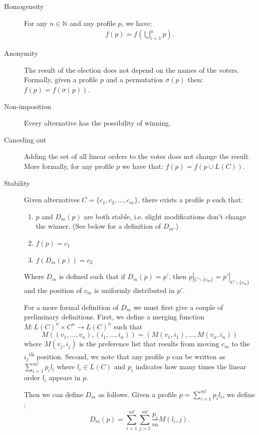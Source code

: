 	\begin{description}
		\item[Homogeneity] For any $n \in \mathbb{N}$ and any profile $p$, we have:
			\begin{align*}
				f(p) = f\left(\bigcup_{i=1}^n p\right).
			\end{align*}
		\item[Anonymity] The result of the election does not depend on the names of the voters. Formally, given a profile $p$ and a permutation $\sigma(p)$ then: $f(p) = f(\sigma(p))$.
		\item[Non-imposition] Every alternative has the possibility of winning.
		\item[Canceling out] Adding the set of all linear orders to the votes does not change the result. More formally, for any profile $p$ we have that: $f(p) = f(p \cup L(C))$.
		\item[Stability] Given alternatives $C = \{c_1, c_2, \ldots, c_m\}$, there exists a profile $p$ such that:
			\begin{enumerate}
				\item $p$ and $D_{m}(p)$ are both stable, i.e. slight modifications don't change the winner. (See below for a definition of $D_{m}$.)
				\item $f(p) = c_1$
				\item $f(D_{m}(p)) = c_2$
			\end{enumerate}
			Where $D_m$ is defined such that if $D_m(p) = p'$, then $p|_{C \backslash \{c_m\}} = p'|_{C \backslash \{c_m\}}$ and the position of $c_m$ is uniformly distributed in $p'$.

			For a more formal definition of $D_m$ we must first give a couple of preliminary definitions. First, we define a merging function $M\colon L(C)^n \times C^n \rightarrow L(C)^n$ such that
			\[
				M((v_1, \ldots, v_n), (i_1, \ldots, i_n)) = (M(v_1, i_1), \ldots, M(v_n, i_n))
			\]
			where $M(v_j, i_j)$ is the preference list that results from moving $c_m$ to the $i_j$\textsuperscript{th} position. Second, we note that any profile $p$ can be written as $\sum_{i=1}^{m!} p_i l_i$ where $l_i \in L(C)$ and $p_i$ indicates how many times the linear order $l_i$ appears in $p$.

			Then we can define $D_m$ as follows. Given a profile $p = \sum_{i=1}^{m!} p_i l_i$, we define \cite{xia2008sufficient}:
			\[
				D_m(p) = \sum_{i=1}^{m!} \sum_{j=1}^{m!} \frac{p_i}{m} M(l_i, j).
			\]
	\end{description}

